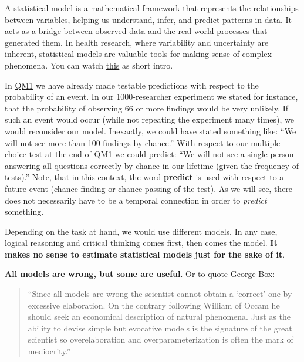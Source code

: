 \documentclass[
]{book}
\begin{document}
A \href{https://en.wikipedia.org/wiki/Statistical_model}{statistical model}
is a mathematical framework that represents the
relationships between variables, helping us understand, infer, and
predict patterns in data. It acts as a bridge between observed data
and the real-world processes that generated them. In health research,
where variability and uncertainty are inherent, statistical models are
valuable tools for making sense of complex phenomena.
You can watch \href{https://www.youtube.com/watch?v=3d5ivs_8amQ&ab_channel=VeryNormal}{this} as short intro.

In \href{https://jdegenfellner.github.io/Script_QM1_ZHAW/probs.html}{QM1} we have already
made testable predictions with respect to the probability of an event.
In our 1000-researcher experiment we stated for instance, that the probability of
observing \(66\) or more findings would be very unlikely. If such an event would
occur (while not repeating the experiment many times), we would reconsider our model.
Inexactly, we could have stated something like: ``We will not see more than 100 findings by chance.''
With respect to our multiple choice test at the end of QM1 we could predict:
``We will not see a single person answering all questions correctly by chance in our
lifetime (given the frequency of tests).'' Note, that in this context, the word \textbf{predict}
is used with respect to a future event (chance finding or chance passing of the test).
As we will see, there does not necessarily have to be a temporal connection in order
to \emph{predict} something.

Depending on the task at hand, we would use different models.
In any case, logical reasoning and critical thinking comes first,
then comes the model. \textbf{It makes no sense to estimate statistical models just for the sake of it}.

\textbf{All models are wrong, but some are useful}.
Or to quote \href{https://www.tandfonline.com/doi/abs/10.1080/01621459.1976.10480949}{George Box}:

\begin{quote}
``Since all models are wrong the scientist cannot obtain
a `correct' one by excessive elaboration. On the contrary
following William of Occam he should seek an economical
description of natural phenomena. Just as the ability to
devise simple but evocative models is the signature of the
great scientist so overelaboration and overparameterization is often the mark of mediocrity.''
\end{quote}
\end{document}
